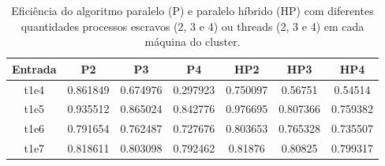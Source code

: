 \documentclass[12pt]{article}
\begin{document}
\begin{table}[H]
	\footnotesize
\begin{adjustbox}{center}
	\begin{tabular}{|c|ccc|ccc|}
		\hline
		Entrada & P2       & P3       & P4       & HP2       & HP3      & HP4      \\
		\hline
		t1e4    & 0.861849 & 0.674976 & 0.297923 & 0.750097 & 0.56751  & 0.54514  \\
		t1e5    & 0.935512 & 0.865024 & 0.842776 & 0.976695 & 0.807366 & 0.759382 \\
		t1e6    & 0.791654 & 0.762487 & 0.727676 & 0.803653 & 0.765328 & 0.735507 \\
		t1e7    & 0.818611 & 0.803098 & 0.792462 & 0.81876  & 0.80825  & 0.799317 \\
		\hline
	\end{tabular}
      \end{adjustbox}
	\caption{Eficiência do algoritmo paralelo (P) e paralelo híbrido (HP) com diferentes quantidades processos escravos (2, 3 e 4) ou threads (2, 3 e 4) em cada máquina do cluster.}
	\label{tab:results_eficiencia}
\end{table}



\end{document}
